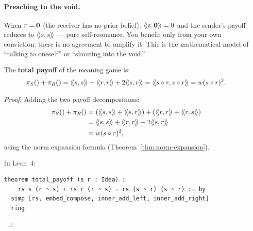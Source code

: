 \begin{interpretation}
\paragraph{Preaching to the void.} When $r = \mathbf{0}$ (the receiver has no prior
belief), $\langle\!\langle s, \mathbf{0} \rangle\!\rangle = 0$ and the sender's payoff reduces to $\langle\!\langle s, s \rangle\!\rangle$
--- pure self-resonance. You benefit only from your own conviction; there is
no agreement to amplify it. This is the mathematical model of ``talking to
oneself'' or ``shouting into the void.''
\end{interpretation}

\begin{theorem}
\label{thm:total-payoff}
The \textbf{total payoff} of the meaning game is:
\[
  \payoff{S}{} + \payoff{R}{} = \rs{s}{s} + \rs{r}{r} + 2\rs{s}{r}
  = \rs{s \compose r}{s \compose r} = w(s \compose r)^2.
\]
\end{theorem}

\begin{proof}
Adding the two payoff decompositions:
\begin{align*}
  \payoff{S}{} + \payoff{R}{}
  &= (\rs{s}{s} + \rs{s}{r}) + (\rs{r}{r} + \rs{r}{s}) \\
  &= \rs{s}{s} + \rs{r}{r} + 2\rs{s}{r} \\
  &= w(s \compose r)^2,
\end{align*}
using the norm expansion formula (Theorem~\ref{thm:norm-expansion}).

In Lean~4:
\begin{lstlisting}
theorem total_payoff (s r : Idea) :
    rs s (r ∘ s) + rs r (r ∘ s) = rs (s ∘ r) (s ∘ r) := by
  simp [rs, embed_compose, inner_add_left, inner_add_right]
  ring
\end{lstlisting}
\end{proof}

